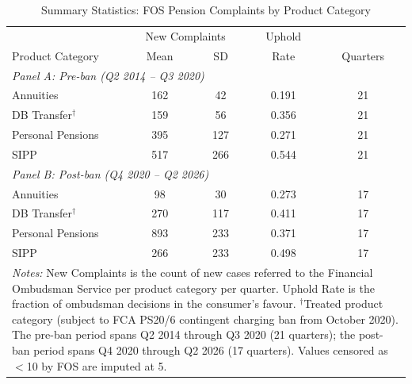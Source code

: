 \begin{table}[t]
\centering
\caption{Summary Statistics: FOS Pension Complaints by Product Category}
\label{tab:sumstats}
\begin{tabular}{lcccc}
\hline\hline
& \multicolumn{2}{c}{New Complaints} & Uphold & \\
Product Category & Mean & SD & Rate & Quarters \\
\hline
\multicolumn{5}{l}{\textit{Panel A: Pre-ban (Q2 2014 -- Q3 2020)}} \\
Annuities & 162 & 42 & 0.191 & 21 \\
DB Transfer$^{\dagger}$ & 159 & 56 & 0.356 & 21 \\
Personal Pensions & 395 & 127 & 0.271 & 21 \\
SIPP & 517 & 266 & 0.544 & 21 \\
\hline
\multicolumn{5}{l}{\textit{Panel B: Post-ban (Q4 2020 -- Q2 2026)}} \\
Annuities & 98 & 30 & 0.273 & 17 \\
DB Transfer$^{\dagger}$ & 270 & 117 & 0.411 & 17 \\
Personal Pensions & 893 & 233 & 0.371 & 17 \\
SIPP & 266 & 233 & 0.498 & 17 \\
\hline\hline
\multicolumn{5}{p{0.85\textwidth}}{\footnotesize \textit{Notes:} New Complaints is the count of new cases referred to the Financial Ombudsman Service per product category per quarter. Uphold Rate is the fraction of ombudsman decisions in the consumer's favour. $^{\dagger}$Treated product category (subject to FCA PS20/6 contingent charging ban from October 2020). The pre-ban period spans Q2 2014 through Q3 2020 (21 quarters); the post-ban period spans Q4 2020 through Q2 2026 (17 quarters). Values censored as $<$10 by FOS are imputed at 5.}
\end{tabular}
\end{table}
